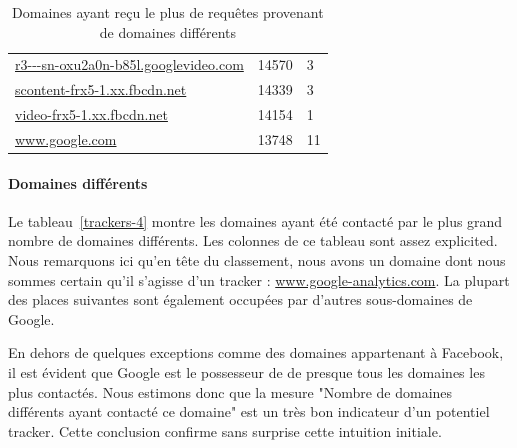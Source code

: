 \begin{table}[]
\begin{tabular}{lll}
\scriptsize \url{r3---sn-oxu2a0n-b85l.googlevideo.com} & 14570             & 3                        \\
\scriptsize \url{scontent-frx5-1.xx.fbcdn.net}         & 14339             & 3                        \\
\scriptsize \url{video-frx5-1.xx.fbcdn.net}            & 14154             & 1                        \\
\scriptsize \url{www.google.com}                       & 13748             & 11                      
\end{tabular}
\caption{Domaines ayant reçu le plus de requêtes provenant de domaines différents}
\label{trackers-3}
\end{table}

			\paragraph{Domaines différents} Le tableau~\ref{trackers-4} montre les domaines ayant été contacté par le plus grand nombre de domaines différents. Les colonnes de ce tableau sont assez explicited. Nous remarquons ici qu'en tête du classement, nous avons un domaine dont nous sommes certain qu'il s'agisse d'un tracker : \url{www.google-analytics.com}. La plupart des places suivantes sont également occupées par d'autres sous-domaines de Google.

			En dehors de quelques exceptions comme des domaines appartenant à Facebook, il est évident que Google est le possesseur de de presque tous les domaines les plus contactés. Nous estimons donc que la mesure "Nombre de domaines différents ayant contacté ce domaine" est un très bon indicateur d'un potentiel tracker. Cette conclusion confirme sans surprise cette intuition initiale.

